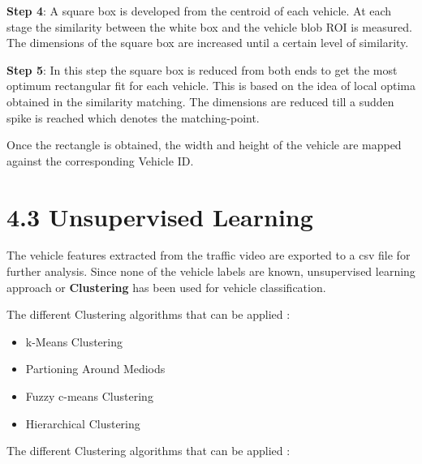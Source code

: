 \documentclass[a4paper,12pt]{article}
\begin{document}
\begin{flushleft}
\textbf{Step 4}: A square box is developed from the centroid of each vehicle. At each stage the similarity between the white box and the vehicle blob ROI is measured. The dimensions of the square box are increased until a certain level of similarity.
\end{flushleft}

\begin{flushleft}
\textbf{Step 5}: In this step the square box is reduced from both ends to get the most optimum rectangular fit for each vehicle. This is based on the idea of local optima obtained in the similarity matching. The dimensions are reduced till a sudden spike is reached which denotes the matching-point.
\end{flushleft}

\vspace{0.05in}
\begin{flushleft}
Once the rectangle is obtained, the width and height of the vehicle are mapped against the corresponding Vehicle ID.
\end{flushleft}

\section*{\large 4.3 Unsupervised Learning}
\vspace{0.1in}

The vehicle features extracted from the traffic video are exported to a csv file for further analysis. Since none of the vehicle labels are known, unsupervised learning approach or \textbf{Clustering} has been used for vehicle classification.

\begin{flushleft}
The different Clustering algorithms that can be applied :
\end{flushleft} 

\begin{itemize}
\setlength{\itemindent}{.2in}
\item k-Means Clustering
\item Partioning Around Mediods
\item Fuzzy c-means Clustering
\item Hierarchical Clustering
\end{itemize}

\begin{flushleft}
The different Clustering algorithms that can be applied :
\end{flushleft} 
\end{document}
